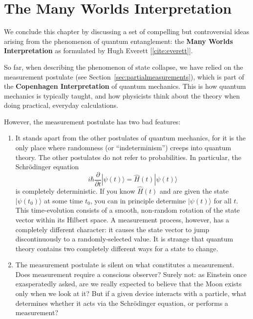\documentclass[pra,12pt]{revtex4-2}
\begin{document}
\section{The Many Worlds Interpretation}

We conclude this chapter by discussing a set of compelling but
controversial ideas arising from the phenomenon of quantum
entanglement: the \textbf{Many Worlds Interpretation} as formulated by
Hugh Everett [\ref{cite:everett}].

So far, when describing the phenomenon of state collapse, we have
relied on the measurement postulate (see
Section~\ref{sec:partialmeasurements}), which is part of the
\textbf{Copenhagen Interpretation} of quantum mechanics.  This is how
quantum mechanics is typically taught, and how physicists think about
the theory when doing practical, everyday calculations.

However, the measurement postulate has two bad features:

\begin{enumerate}
\item It stands apart from the other postulates of quantum mechanics,
  for it is the only place where randomness (or ``indeterminism'')
  creeps into quantum theory.  The other postulates do not refer to
  probabilities.  In particular, the Schr\"odinger equation
\begin{equation}
  i\hbar\frac{\partial}{\partial t}|\psi(t)\rangle = \hat{H}(t) |\psi(t)\rangle
\end{equation}
is completely deterministic.  If you know $\hat{H}(t)$ and are given
the state $|\psi(t_0)\rangle$ at some time $t_0$, you can in principle
determine $|\psi(t)\rangle$ for all $t$.  This time-evolution consists
of a smooth, non-random rotation of the state vector within its
Hilbert space.  A measurement process, however, has a completely
different character: it causes the state vector to jump
discontinuously to a randomly-selected value.  It is strange that
quantum theory contains two completely different ways for a state to
change.

\item The measurement postulate is silent on what constitutes a
measurement.  Does measurement require a conscious observer?  Surely
not: as Einstein once exasperatedly asked, are we really expected to
believe that the Moon exists only when we look at it?  But if a given
device interacts with a particle, what determines whether it acts via
the Schr\"odinger equation, or performs a measurement?
\end{enumerate}
\end{document}
